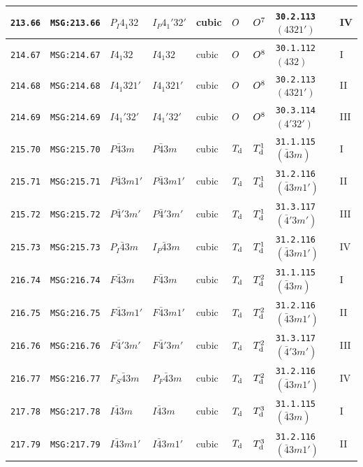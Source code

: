 \documentclass[fleqn,10pt]{jsarticle}
\begin{document}
\begin{center}
\begin{longtable}{lllllllll}
\texttt{213.66} & \texttt{MSG:213.66} & $P_{I}4_{1}32$ & $I_{P}4_{1}'32'$ & cubic & $O_{\rm }$ & $O_{\rm }^{7}$ & \texttt{30.2.113} $(4321')$ & IV \\ \hline
\texttt{214.67} & \texttt{MSG:214.67} & $I4_{1}32$ & $I4_{1}32$ & cubic & $O_{\rm }$ & $O_{\rm }^{8}$ & \texttt{30.1.112} $(432)$ & I \\
\texttt{214.68} & \texttt{MSG:214.68} & $I4_{1}321'$ & $I4_{1}321'$ & cubic & $O_{\rm }$ & $O_{\rm }^{8}$ & \texttt{30.2.113} $(4321')$ & II \\
\texttt{214.69} & \texttt{MSG:214.69} & $I4_{1}'32'$ & $I4_{1}'32'$ & cubic & $O_{\rm }$ & $O_{\rm }^{8}$ & \texttt{30.3.114} $(4'32')$ & III \\ \hline
\texttt{215.70} & \texttt{MSG:215.70} & $P\bar{4}3m$ & $P\bar{4}3m$ & cubic & $T_{\rm d}$ & $T_{\rm d}^{1}$ & \texttt{31.1.115} $(\bar{4}3m)$ & I \\
\texttt{215.71} & \texttt{MSG:215.71} & $P\bar{4}3m1'$ & $P\bar{4}3m1'$ & cubic & $T_{\rm d}$ & $T_{\rm d}^{1}$ & \texttt{31.2.116} $(\bar{4}3m1')$ & II \\
\texttt{215.72} & \texttt{MSG:215.72} & $P\bar{4}'3m'$ & $P\bar{4}'3m'$ & cubic & $T_{\rm d}$ & $T_{\rm d}^{1}$ & \texttt{31.3.117} $(\bar{4}'3m')$ & III \\
\texttt{215.73} & \texttt{MSG:215.73} & $P_{I}\bar{4}3m$ & $I_{P}\bar{4}3m$ & cubic & $T_{\rm d}$ & $T_{\rm d}^{1}$ & \texttt{31.2.116} $(\bar{4}3m1')$ & IV \\ \hline
\texttt{216.74} & \texttt{MSG:216.74} & $F\bar{4}3m$ & $F\bar{4}3m$ & cubic & $T_{\rm d}$ & $T_{\rm d}^{2}$ & \texttt{31.1.115} $(\bar{4}3m)$ & I \\
\texttt{216.75} & \texttt{MSG:216.75} & $F\bar{4}3m1'$ & $F\bar{4}3m1'$ & cubic & $T_{\rm d}$ & $T_{\rm d}^{2}$ & \texttt{31.2.116} $(\bar{4}3m1')$ & II \\
\texttt{216.76} & \texttt{MSG:216.76} & $F\bar{4}'3m'$ & $F\bar{4}'3m'$ & cubic & $T_{\rm d}$ & $T_{\rm d}^{2}$ & \texttt{31.3.117} $(\bar{4}'3m')$ & III \\
\texttt{216.77} & \texttt{MSG:216.77} & $F_{S}\bar{4}3m$ & $P_{F}\bar{4}3m$ & cubic & $T_{\rm d}$ & $T_{\rm d}^{2}$ & \texttt{31.2.116} $(\bar{4}3m1')$ & IV \\ \hline
\texttt{217.78} & \texttt{MSG:217.78} & $I\bar{4}3m$ & $I\bar{4}3m$ & cubic & $T_{\rm d}$ & $T_{\rm d}^{3}$ & \texttt{31.1.115} $(\bar{4}3m)$ & I \\
\texttt{217.79} & \texttt{MSG:217.79} & $I\bar{4}3m1'$ & $I\bar{4}3m1'$ & cubic & $T_{\rm d}$ & $T_{\rm d}^{3}$ & \texttt{31.2.116} $(\bar{4}3m1')$ & II \\

\end{longtable}
\end{center}
\end{document}
